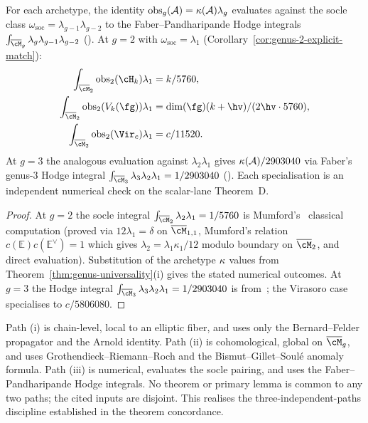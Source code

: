 \begin{proposition}
\label{prop:archetype-specialisation-obs-g}
For each archetype, the identity
$\mathrm{obs}_g(\mathcal{A})=\kappa(\mathcal{A})\lambda_g$ evaluates against the
socle class $\omega_{\mathrm{soc}}=\lambda_{g-1}\lambda_{g-2}$ to
the Faber--Pandharipande Hodge integrals
$\int_{\overline{\cM}_g}\lambda_g\lambda_{g-1}\lambda_{g-2}$
\textup{(}\cite{FP00}\textup{)}. At $g=2$ with
$\omega_{\mathrm{soc}}=\lambda_{1}$
\textup{(}Corollary~\ref{cor:genus-2-explicit-match}\textup{)}:
\begin{align*}
\int_{\overline{\cM}_2}\mathrm{obs}_{2}(\cH_{k})\lambda_{1}
&= k/5760,\\
\int_{\overline{\cM}_2}\mathrm{obs}_{2}(V_{k}(\fg))\lambda_{1}
&= \dim(\fg)(k+\hv)/(2\hv\cdot 5760),\\
\int_{\overline{\cM}_2}\mathrm{obs}_{2}(\Vir_{c})\lambda_{1}
&= c/11520.
\end{align*}
At $g=3$ the analogous evaluation against
$\lambda_{2}\lambda_{1}$ gives
$\kappa(\mathcal{A})/2903040$ via Faber's genus-$3$ Hodge integral
$\int_{\overline{\cM}_3}\lambda_3\lambda_2\lambda_1=1/2903040$
\textup{(}\cite{FP00}\textup{)}.
Each specialisation is an independent numerical check on the
scalar-lane Theorem~D.
\end{proposition}

\begin{proof}
At $g=2$ the socle integral
$\int_{\overline{\cM}_2}\lambda_{2}\lambda_{1}=1/5760$ is
Mumford's~\cite{Mumford83} classical computation
(proved via $12\lambda_{1}=\delta$ on
$\overline{\cM}_{1,1}$, Mumford's relation
$c(\mathbb{E})c(\mathbb{E}^\vee)=1$ which gives
$\lambda_{2}=\lambda_{1}\kappa_{1}/12$ modulo boundary on
$\overline{\cM}_{2}$, and direct evaluation).
Substitution of the archetype $\kappa$ values from
Theorem~\ref{thm:genus-universality}(i) gives the stated numerical
outcomes. At $g=3$ the Hodge integral
$\int_{\overline{\cM}_3}\lambda_3\lambda_2\lambda_1=1/2903040$ is
from~\cite{FP00}; the Virasoro
case specialises to $c/5806080$. \end{proof}

\begin{remark}
\label{rem:three-paths-independence}
Path (i) is chain-level, local to an elliptic fiber, and uses only
the Bernard--Felder propagator and the Arnold identity. Path (ii) is
cohomological, global on $\overline{\cM}_g$, and uses
Grothendieck--Riemann--Roch and the Bismut--Gillet--Soul\'e anomaly
formula. Path (iii) is numerical, evaluates the socle pairing, and
uses the Faber--Pandharipande Hodge integrals. No theorem or
primary lemma is common to any two paths; the cited inputs are
disjoint. This realises the three-independent-paths discipline
established in the theorem concordance.
\end{remark}

